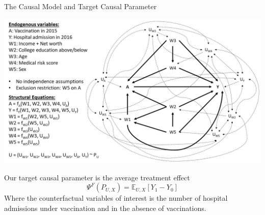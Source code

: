 \documentclass[english]{beamer}
\def\E{\mathbb{E}}
\begin{document}
\begin{frame}{The Causal Model and Target Causal Parameter}
\centerline{\includegraphics[scale=.275]{figures/DAG.PNG}}
\footnotesize Our target causal parameter is the average treatment effect
$$\Psi^F(P_{U,X}) = \E_{U,X}[Y_1-Y_0]$$
\footnotesize Where the counterfactual variables of interest is the number of hospital admissions under vaccination and in the absence of vaccinations.
\end{frame}
\end{document}
